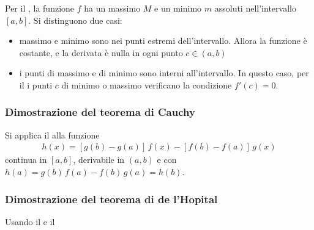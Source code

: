 \documentclass[letterpaper,10pt,italian]{jupyterBook}
\begin{document}
\sphinxAtStartPar
Per il {\hyperref[\detokenize{ch/infinitesimal_calculus/analysis:infinitesimal-calculus-continuous-fun-thms-weierstrass}]{}}, la funzione \(f\) ha un massimo \(M\) e un minimo \(m\) assoluti nell’intervallo \([a,b]\). Si distinguono due casi:
\begin{itemize}
\item {} 
\sphinxAtStartPar
massimo e minimo sono nei punti estremi dell’intervallo. Allora la funzione è costante, e la derivata è nulla in ogni punto \(c \in (a,b)\)

\item {} 
\sphinxAtStartPar
i punti di massimo e di minimo sono interni all’intervallo. In questo caso, per il {\hyperref[\detokenize{ch/infinitesimal_calculus/derivatives:infinitesimal-calculus-derivatives-thm-rolle}]{}} i punti \(c\) di minimo o massimo verificano la condizione \(f'(c) = 0\).

\end{itemize}
\label{\detokenize{ch/infinitesimal_calculus/derivatives-notes:infinitesimal-calculus-derivatives-thm-cauchy-notes}}\subsubsection*{Dimostrazione del teorema di Cauchy}

\sphinxAtStartPar
Si applica il {\hyperref[\detokenize{ch/infinitesimal_calculus/derivatives:infinitesimal-calculus-derivatives-thm-rolle}]{}} alla funzione
\begin{equation*}
\begin{split}h(x) = \left[ g(b) - g(a) \right] \, f(x) - \left[ f(b) - f(a) \right] \, g(x)\end{split}
\end{equation*}
\sphinxAtStartPar
continua in \([a,b]\), derivabile in \((a,b)\) e con \(h(a) = g(b) \, f(a) - f(b) \, g(a) = h(b)\).


\label{\detokenize{ch/infinitesimal_calculus/derivatives-notes:infinitesimal-calculus-derivatives-thm-hopital-notes}}\subsubsection*{Dimostrazione del teorema di de l’Hopital}

\sphinxAtStartPar
{} Usando il {\hyperref[\detokenize{ch/infinitesimal_calculus/derivatives:infinitesimal-calculus-derivatives-thm-cauchy}]{}} e il {\hyperref[\detokenize{ch/infinitesimal_calculus/derivatives:infinitesimal-calculus-derivatives-thm-rolle}]{}} 
\end{document}
